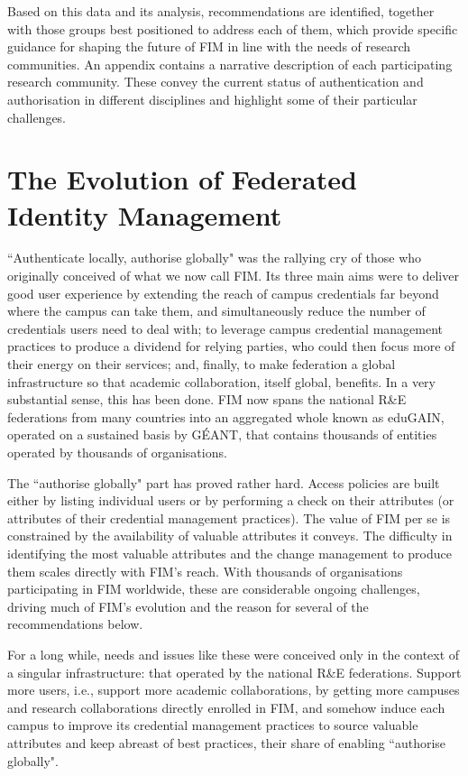 \documentclass[fleqn,10pt]{wlscirep}
\begin{document}
{Based on this data and its analysis, recommendations are identified, together with those groups best positioned to address each of them, which provide specific guidance for shaping the future of FIM in line with the needs of research communities. An appendix contains a narrative description of each participating research community. These convey the current status of authentication and authorisation in different disciplines and highlight some of their particular challenges. 

\section{The Evolution of Federated Identity Management}
``Authenticate locally, authorise globally" was the rallying cry of those who originally conceived of what we now call FIM. Its three main aims were to deliver good user experience by extending the reach of campus credentials far beyond where the campus can take them, and simultaneously reduce the number of credentials users need to deal with; to leverage campus credential management practices to produce a dividend for relying parties, who could then focus more of their energy on their services; and, finally, to make federation a global infrastructure so that academic collaboration, itself global, benefits. In a very substantial sense, this has been done. FIM now spans the national R\&E federations from many countries into an aggregated whole known as eduGAIN\cite{edugain}, operated on a sustained basis by GÉANT, that contains thousands of entities operated by thousands of organisations. 

The ``authorise globally" part has proved rather hard. Access policies are built either by listing individual users or by performing a check on their attributes (or attributes of their credential management practices). The value of FIM per se is constrained by the availability of valuable attributes it conveys. The difficulty in identifying the most valuable attributes and the change management to produce them scales directly with FIM’s reach. With thousands of organisations participating in FIM worldwide, these are considerable ongoing challenges, driving much of FIM’s evolution and the reason for several of the recommendations below. 

For a long while, needs and issues like these were conceived only in the context of a singular infrastructure: that operated by the national R\&E federations. Support more users, i.e., support more academic collaborations, by getting more campuses and research collaborations directly enrolled in FIM, and somehow induce each campus to improve its credential management practices to source valuable attributes and keep abreast of best practices, their share of enabling ``authorise globally". 

}
\end{document}
